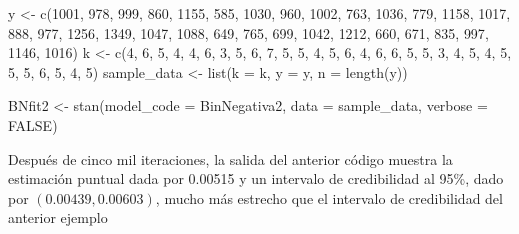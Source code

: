 \documentclass[
  10pt,
  spanish,
]{book}
\newenvironment{Shaded}{\begin{snugshade}}{\end{snugshade}}
\newcommand{\AttributeTok}[1]{\textcolor[rgb]{0.77,0.63,0.00}{#1}}
\newcommand{\ConstantTok}[1]{\textcolor[rgb]{0.00,0.00,0.00}{#1}}
\newcommand{\DecValTok}[1]{\textcolor[rgb]{0.00,0.00,0.81}{#1}}
\newcommand{\FunctionTok}[1]{\textcolor[rgb]{0.00,0.00,0.00}{#1}}
\newcommand{\NormalTok}[1]{#1}
\newcommand{\OtherTok}[1]{\textcolor[rgb]{0.56,0.35,0.01}{#1}}
\theoremstyle{definition}
\theoremstyle{definition}
\theoremstyle{definition}
\theoremstyle{definition}
\theoremstyle{remark}
\begin{document}
\begin{Shaded}
\begin{Highlighting}[]
\NormalTok{y }\OtherTok{\textless{}{-}} \FunctionTok{c}\NormalTok{(}\DecValTok{1001}\NormalTok{, }\DecValTok{978}\NormalTok{, }\DecValTok{999}\NormalTok{, }\DecValTok{860}\NormalTok{, }\DecValTok{1155}\NormalTok{, }\DecValTok{585}\NormalTok{, }\DecValTok{1030}\NormalTok{, }
       \DecValTok{960}\NormalTok{, }\DecValTok{1002}\NormalTok{, }\DecValTok{763}\NormalTok{, }\DecValTok{1036}\NormalTok{, }\DecValTok{779}\NormalTok{, }\DecValTok{1158}\NormalTok{, }\DecValTok{1017}\NormalTok{, }
       \DecValTok{888}\NormalTok{, }\DecValTok{977}\NormalTok{, }\DecValTok{1256}\NormalTok{, }\DecValTok{1349}\NormalTok{, }\DecValTok{1047}\NormalTok{, }\DecValTok{1088}\NormalTok{, }\DecValTok{649}\NormalTok{, }
       \DecValTok{765}\NormalTok{, }\DecValTok{699}\NormalTok{, }\DecValTok{1042}\NormalTok{, }\DecValTok{1212}\NormalTok{, }\DecValTok{660}\NormalTok{, }\DecValTok{671}\NormalTok{, }\DecValTok{835}\NormalTok{, }
       \DecValTok{997}\NormalTok{, }\DecValTok{1146}\NormalTok{, }\DecValTok{1016}\NormalTok{)}
\NormalTok{k }\OtherTok{\textless{}{-}} \FunctionTok{c}\NormalTok{(}\DecValTok{4}\NormalTok{, }\DecValTok{6}\NormalTok{, }\DecValTok{5}\NormalTok{, }\DecValTok{4}\NormalTok{, }\DecValTok{4}\NormalTok{, }\DecValTok{6}\NormalTok{, }\DecValTok{3}\NormalTok{, }\DecValTok{5}\NormalTok{, }\DecValTok{6}\NormalTok{, }\DecValTok{7}\NormalTok{, }\DecValTok{5}\NormalTok{, }\DecValTok{5}\NormalTok{, }\DecValTok{4}\NormalTok{, }
       \DecValTok{5}\NormalTok{, }\DecValTok{6}\NormalTok{, }\DecValTok{4}\NormalTok{, }\DecValTok{6}\NormalTok{, }\DecValTok{6}\NormalTok{, }\DecValTok{5}\NormalTok{, }\DecValTok{5}\NormalTok{, }\DecValTok{3}\NormalTok{, }\DecValTok{4}\NormalTok{, }\DecValTok{5}\NormalTok{, }\DecValTok{4}\NormalTok{, }\DecValTok{5}\NormalTok{, }\DecValTok{5}\NormalTok{, }
       \DecValTok{5}\NormalTok{, }\DecValTok{6}\NormalTok{, }\DecValTok{5}\NormalTok{, }\DecValTok{4}\NormalTok{, }\DecValTok{5}\NormalTok{)}
\NormalTok{sample\_data }\OtherTok{\textless{}{-}} \FunctionTok{list}\NormalTok{(}\AttributeTok{k =}\NormalTok{ k, }\AttributeTok{y =}\NormalTok{ y, }\AttributeTok{n =} \FunctionTok{length}\NormalTok{(y))}

\NormalTok{BNfit2 }\OtherTok{\textless{}{-}} \FunctionTok{stan}\NormalTok{(}\AttributeTok{model\_code =}\NormalTok{ BinNegativa2,}
               \AttributeTok{data =}\NormalTok{ sample\_data, }\AttributeTok{verbose =} \ConstantTok{FALSE}\NormalTok{)}
\end{Highlighting}
\end{Shaded}

Después de cinco mil iteraciones, la salida del anterior código muestra la estimación puntual dada por 0.00515 y un intervalo de credibilidad al 95\%, dado por \((0.00439, 0.00603)\), mucho más estrecho que el intervalo de credibilidad del anterior ejemplo
\end{document}
